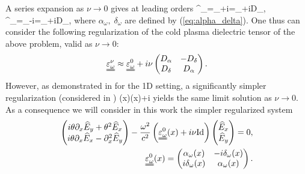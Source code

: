 A series expansion as $\nu\rightarrow 0$ gives at leading orders
\bealn
 \alpha^{\nu}_{\omega}=\alpha_{\omega}+i\nu{}=\alpha_{\omega}+i\nu D_{\alpha},\\
 \delta^{\nu}_{\omega}=\delta_{\omega}-i\nu{}=\delta_{\omega}+i\nu D_{\delta},
\eealn
where $\alpha_{\omega},\;\delta_{\omega}$ are defined by (\ref{eq:alpha_delta}). %
One thus can consider 
the following regularization of the cold plasma dielectric tensor of the above problem, valid as $\nu\rightarrow 0$:
\begin{align*}
\uuline{\varepsilon_{\omega}^{\nu}}\approx \uuline{\varepsilon_{\omega}^{0}}+i\nu \left(
 \begin{matrix}
  D_{\alpha} & -D_{\delta}\\
  D_{\delta} & D_{\alpha}
 \end{matrix}
\right).
\end{align*}
However, as demonstrated in \cite{singular_solutions} for the 1D setting, a significantly simpler regularization (considered in \cite{Despres_2014})
\ben
\uuline{\varepsilon_{\omega}^{\nu}}(x)\approx {}(x)+i\nu {}
\een
yields the same limit solution as $\nu\rightarrow 0$.
As a consequence we will consider in this work the simpler regularized system
\begin{align*}
\left(
\begin{matrix}
 i\theta \partial_x \widehat{E}_y+\theta^2 \widehat{E}_x\\
 i\theta \partial_x \widehat{E}_x -\partial_x^2 \widehat{E}_y
\end{matrix}
\right)-\frac{\omega^2}{c^2}
\left(\uuline{\varepsilon_{\omega}^{0}}(x)+i\nu \mathrm{Id}\right)\left(
\begin{matrix}
 \widehat{E}_x\\
 \widehat{E}_y
\end{matrix}
\right)
=0,\\
\uuline{\varepsilon_{\omega}^{0}}(x)=\left(
\begin{matrix}
 \alpha_{\omega}(x) & -i\delta_{\omega}(x) \\
 i\delta_{\omega}(x) & \alpha_{\omega}(x)
\end{matrix}
\right). 
\end{align*}

